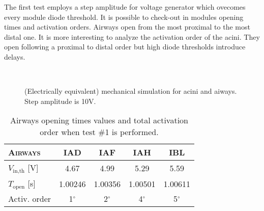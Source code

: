 The first test employs a step amplitude for voltage generator which
ovecomes every module diode threshold.  It is possible to check-out in
 modules
opening times and activation orders.  Airways open from the most
proximal to the most distal one.  It is more interesting to analyze
the activation order of the acini.  They open following a proximal
to distal order but high diode thresholds introduce delays.


\begin{figure}[H]\centering
  \hspace{1cm}
  \\
  \hspace{1cm}
  \caption{(Electrically equivalent) mechanical simulation for acini
    and aiways.  Step amplitude is 10V.}
  \label{fig:mechanical_results_10}
\end{figure}

\begin{table}[H]\centering
  {\renewcommand{\arraystretch}{1.2}
    \begin{tabularx}{\textwidth}{|P{6em}|C|C|C|C|}
      \hline
      \textsc{Airways}
      & IAD
      & IAF
      & IAH
      & IBL\\
      \hline
      $V_{\text{in,th}}$ [V]
      & 4.67
      & 4.99
      & 5.29
      & 5.59\\
      \hline
      $T_{\text{open}}$ [s]
      & 1.00246
      & 1.00356
      & 1.00501
      & 1.00611\\
      \hline
      Activ. order
      & 1$^{\circ}$
      & 2$^{\circ}$
      & 4$^{\circ}$
      & 5$^{\circ}$\\
      \hline
    \end{tabularx}
  }
  \caption{Airways opening times values and total activation order
    when test \#1 is performed.}
  \label{tab:airways_test1}
\end{table}

